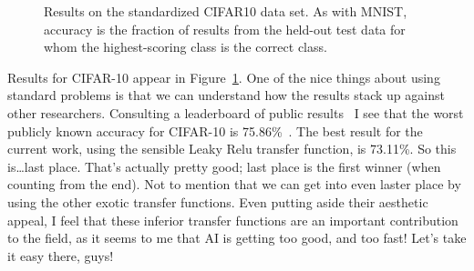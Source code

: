 \documentclass[twocolumn]{article}
\begin{document}
\begin{figure}[htp]
  \begin{center}
    
  \end{center}
  \caption{
    Results on the standardized CIFAR10 data set. As with MNIST,
    accuracy is the fraction of results from the held-out test
    data for whom the highest-scoring class is the correct class.
  } \label{fig:cifar10results}
\end{figure}


Results for CIFAR-10 appear in Figure~\ref{fig:cifar10results}.
One of the nice things about using standard problems is that we
can understand how the results stack up against other researchers.
Consulting a leaderboard of public results~\cite{benenson2023are}
I see that the worst publicly known accuracy for CIFAR-10 is 75.86\%~\cite{mcdonnell2015enhanced}.
The best result for the current work, using the sensible Leaky Relu transfer function,
is 73.11\%. So this is\ldots last place. That's actually pretty good;
last place is the first winner (when counting from the end). Not to
mention that we can get into even laster place by using the other
exotic transfer functions. Even putting aside their aesthetic appeal,
I feel that these inferior transfer functions are an important
contribution to the field, as it seems to me that AI is getting too
good, and too fast! Let's take it easy there, guys!
\end{document}
